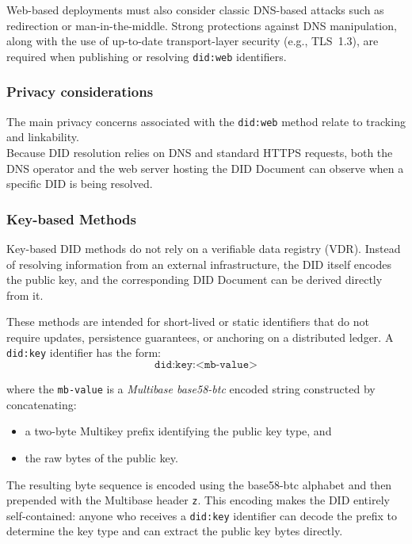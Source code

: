 \noindent
Web-based deployments must also consider classic DNS-based attacks such as redirection or man-in-the-middle. Strong protections against DNS manipulation, along with the use of up-to-date transport-layer security (e.g., TLS~1.3), are required when publishing or resolving \texttt{did:web} identifiers.

\subsubsection*{Privacy considerations}
The main privacy concerns associated with the \texttt{did:web} method relate to tracking and linkability.\\ 
Because DID resolution relies on DNS and standard HTTPS requests, both the DNS operator and the web server hosting the DID Document can observe when a specific DID is being resolved.
\newpage

\subsubsection{Key-based Methods}

Key-based DID methods do not rely on a verifiable data registry (VDR).  
Instead of resolving information from an external infrastructure, the DID itself
encodes the public key, and the corresponding DID Document can be derived directly from it.

\medskip

\noindent
These methods are intended for short-lived or static identifiers that do not require
updates, persistence guarantees, or anchoring on a distributed ledger.  
A \texttt{did:key} identifier has the form:
\[
\texttt{did:key:<mb-value>}
\]

\noindent
where the \texttt{mb-value} is a \textit{Multibase base58-btc} encoded string constructed by concatenating:
\begin{itemize}
    \item a two-byte Multikey prefix identifying the public key type, and
    \item the raw bytes of the public key.
\end{itemize}

\noindent
The resulting byte sequence is encoded using the base58-btc alphabet and then
prepended with the Multibase header \texttt{z}.  
This encoding makes the DID entirely self-contained: anyone who receives a
\texttt{did:key} identifier can decode the prefix to determine the key type and can extract the public key bytes directly.

